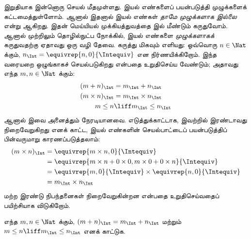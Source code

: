 \documentclass[../../../include/open-logic-section]{subfiles}
\begin{document}
இறுதியாக இன்னொரு செயல் மீதமுள்ளது.
இயல் எண்களைப் பயன்படுத்தி முழுக்களைக் கட்டமைத்துள்ளோம்.
ஆனால் இதனால் இயல் எண்கள் \emph{தாமே முழுக்களாக இல்லை} என்று ஆகிறது.
இதன் மெய்யியல் முக்கியத்துவத்தை  இல் மீண்டும் கருதுவோம்.
ஆனால் முற்றிலும் தொழில்நுட்ப நோக்கில்,
இயல் எண்களை \emph{முழுக்களாகக்} கருதுவதற்கு ஏதாவது ஒரு வழி தேவை.
கருத்து மிகவும் எளியது: ஒவ்வொரு $n \in \Nat$ க்கும்,
$n_\Int = \equivrep{n, 0}{\Intequiv}$ என நிர்ணயிக்கிறோம்.
இந்த வரையறை ஒழுங்காகச் செயல்படுகிறது என்பதை உறுதிசெய்ய வேண்டும்;
அதாவது எந்த $m, n \in \Nat$ க்கும்:
\begin{align*}
	(m + n)_\Int &= m_\Int + n_\Int\\
	(m \times n)_\Int &= m_\Int \times n_\Int\\
	m \leq n &\liff m_\Int \leq n_\Int
\end{align*}
ஆனால் இவை அனைத்தும் நேரடியானவை.
எடுத்துக்காட்டாக, இவற்றில் இரண்டாவது நிறைவேறுகிறது எனக் காட்ட,
இயல் எண்களின் செயல்பாட்டைப் பயன்படுத்திப் பின்வருமாறு காரணப்படுத்தலாம்:
	\begin{align*}
		(m \times n)_\Int  &= \equivrep{m \times n, 0}{\Intequiv} \\
		&= \equivrep{m \times n + 0 \times 0, m \times 0 + 0 \times n}{\Intequiv} \\
		&= \equivrep{m, 0}{\Intequiv} \times \equivrep{n, 0}{\Intequiv} \\
		&= m_\Int \times n_\Int
	\end{align*}
மற்ற இரண்டு நிபந்தனைகள் நிறைவேறுகின்றன என்பதை உறுதிசெய்வதைப்
பயிற்சியாக விடுகிறோம்.

\begin{prob}
	எந்த $m, n \in \Nat$ க்கும்,
    $(m + n)_\Int = m_\Int + n_\Int$ மற்றும்
    $m \leq n \liff m_\Int \leq n_\Int$ எனக் காட்டுக.
\end{prob}
\end{document}
